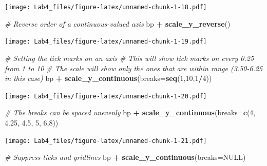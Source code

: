 \documentclass[]{article}
\newenvironment{Shaded}{\begin{snugshade}}{\end{snugshade}}
\newcommand{\KeywordTok}[1]{\textcolor[rgb]{0.13,0.29,0.53}{\textbf{#1}}}
\newcommand{\DataTypeTok}[1]{\textcolor[rgb]{0.13,0.29,0.53}{#1}}
\newcommand{\DecValTok}[1]{\textcolor[rgb]{0.00,0.00,0.81}{#1}}
\newcommand{\FloatTok}[1]{\textcolor[rgb]{0.00,0.00,0.81}{#1}}
\newcommand{\StringTok}[1]{\textcolor[rgb]{0.31,0.60,0.02}{#1}}
\newcommand{\CommentTok}[1]{\textcolor[rgb]{0.56,0.35,0.01}{\textit{#1}}}
\newcommand{\OtherTok}[1]{\textcolor[rgb]{0.56,0.35,0.01}{#1}}
\newcommand{\OperatorTok}[1]{\textcolor[rgb]{0.81,0.36,0.00}{\textbf{#1}}}
\newcommand{\NormalTok}[1]{#1}
\begin{document}
\texttt{[image: Lab4\_files/figure-latex/unnamed-chunk-1-18.pdf]}

\begin{Shaded}
\begin{Highlighting}[]
\CommentTok{# Reverse order of a continuous-valued axis}
\NormalTok{bp }\OperatorTok{+}\StringTok{ }\KeywordTok{scale_y_reverse}\NormalTok{()}
\end{Highlighting}
\end{Shaded}

\texttt{[image: Lab4\_files/figure-latex/unnamed-chunk-1-19.pdf]}

\begin{Shaded}
\begin{Highlighting}[]
\CommentTok{# Setting the tick marks on an axis}
\CommentTok{# This will show tick marks on every 0.25 from 1 to 10}
\CommentTok{# The scale will show only the ones that are within range (3.50-6.25 in this case)}
\NormalTok{bp }\OperatorTok{+}\StringTok{ }\KeywordTok{scale_y_continuous}\NormalTok{(}\DataTypeTok{breaks=}\KeywordTok{seq}\NormalTok{(}\DecValTok{1}\NormalTok{,}\DecValTok{10}\NormalTok{,}\DecValTok{1}\OperatorTok{/}\DecValTok{4}\NormalTok{))}
\end{Highlighting}
\end{Shaded}

\texttt{[image: Lab4\_files/figure-latex/unnamed-chunk-1-20.pdf]}

\begin{Shaded}
\begin{Highlighting}[]
\CommentTok{# The breaks can be spaced unevenly}
\NormalTok{bp }\OperatorTok{+}\StringTok{ }\KeywordTok{scale_y_continuous}\NormalTok{(}\DataTypeTok{breaks=}\KeywordTok{c}\NormalTok{(}\DecValTok{4}\NormalTok{, }\FloatTok{4.25}\NormalTok{, }\FloatTok{4.5}\NormalTok{, }\DecValTok{5}\NormalTok{, }\DecValTok{6}\NormalTok{,}\DecValTok{8}\NormalTok{))}
\end{Highlighting}
\end{Shaded}

\texttt{[image: Lab4\_files/figure-latex/unnamed-chunk-1-21.pdf]}

\begin{Shaded}
\begin{Highlighting}[]
\CommentTok{# Suppress ticks and gridlines}
\NormalTok{bp }\OperatorTok{+}\StringTok{ }\KeywordTok{scale_y_continuous}\NormalTok{(}\DataTypeTok{breaks=}\OtherTok{NULL}\NormalTok{)}
\end{Highlighting}
\end{Shaded}
\end{document}
